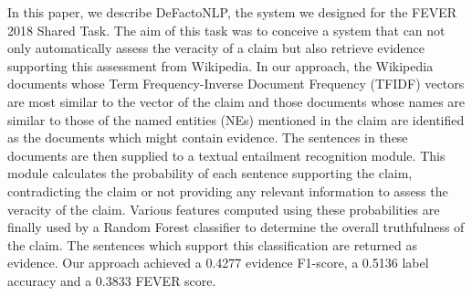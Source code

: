 In this paper, we describe DeFactoNLP, the system we designed for the FEVER 2018 Shared Task. The aim of this task was to conceive a system that can not only automatically assess the veracity of a claim but also retrieve evidence supporting this assessment from Wikipedia. In our approach, the Wikipedia documents whose Term Frequency-Inverse Document Frequency (TFIDF) vectors are most similar to the vector of the claim and those documents whose names are similar to those of the named entities (NEs) mentioned in the claim are identified as the documents which might contain evidence. The sentences in these documents are then supplied to a textual entailment recognition module. This module calculates the probability of each sentence supporting the claim, contradicting the claim or not providing any relevant information to assess the veracity of the claim. Various features computed using these probabilities are finally used by a Random Forest classifier to determine the overall truthfulness of the claim. The sentences which support this classification are returned as evidence. Our approach achieved a 0.4277 evidence F1-score, a 0.5136 label accuracy and a 0.3833 FEVER score.
